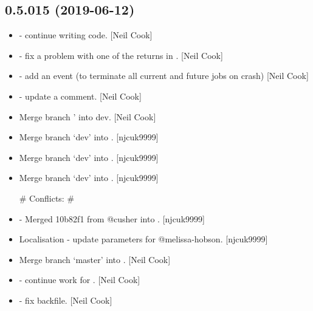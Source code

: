 \documentclass[a4paper,10pt,english]{report}
\begin{document}
\subsection{0.5.015 (2019-06-12)}
\label{\detokenize{misc/changelog:id122}}\begin{itemize}
\item {} 
 - continue writing code. {[}Neil Cook{]}

\item {} 
 - fix a problem with one of the returns in
. {[}Neil Cook{]}

\item {} 
 - add an event (to terminate all current and
future jobs on crash) {[}Neil Cook{]}

\item {} 
 - update a comment. {[}Neil Cook{]}

\item {} 
Merge branch ’ into dev. {[}Neil Cook{]}

\item {} 
Merge branch ‘dev’ into . {[}njcuk9999{]}

\item {} 
Merge branch ‘dev’ into . {[}njcuk9999{]}

\item {} 
Merge branch ‘dev’ into . {[}njcuk9999{]}

\# Conflicts:
\#    

\item {} 
 - Merged 10b82f1 from @cusher into . {[}njcuk9999{]}

\item {} 
Localisation - update parameters for @melissa-hobson. {[}njcuk9999{]}

\item {} 
Merge branch ‘master’ into . {[}Neil Cook{]}

\item {} 
 - continue work for . {[}Neil Cook{]}

\item {} 
 - fix backfile. {[}Neil Cook{]}


\end{itemize}
\end{document}
